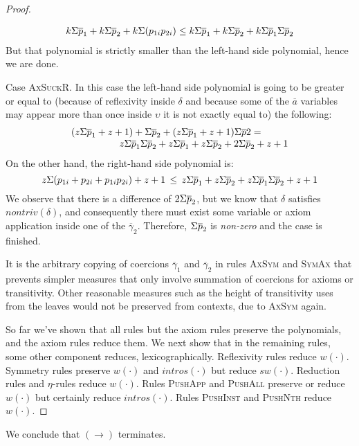 \documentclass[a4paper,UKenglish]{lipics}
\def\rulename#1{\textsc{#1}}
\def\rulename#1{\textsc{#1}}
\newcommand{\ol}[1]{\overline{#1}}
\newcommand{\as}{\ol{a}}
\newcommand{\gammas}{\ol{\gamma}}
\begin{document}
\begin{proof}
\begin{itemize*}
  \[\begin{array}{ll}
       k\Sigma\ps_1 + k\Sigma\ps_2 + k\Sigma(p_{1i}p_{2i}) \leq 
       k\Sigma\ps_1 + k\Sigma\ps_2 + k\Sigma\ps_1\Sigma\ps_2   
  \end{array}\] 
  But that polynomial is strictly smaller than the left-hand side polynomial, hence we are done.
  \item Case \rulename{AxSuckR}. In this case the left-hand side polynomial is going to be greater
        or equal to (because of reflexivity inside $\delta$ and because some of the $\as$ variables may 
        appear more than once inside $\upsilon$ it is not exactly equal to) the following: 
        \[\begin{array}{l} 
           (z\Sigma\ps_1+z+1) + \Sigma\ps_2 + (z\Sigma\ps_1+z+1)\Sigma\ps2 = \\ 
           \quad\quad\quad\quad\quad z\Sigma\ps_1\Sigma\ps_2 + z\Sigma\ps_1 + z\Sigma\ps_2 + 2\Sigma\ps_2 + z + 1 
          \end{array}\]
        On the other hand, the right-hand side polynomial is: 
$$
           z\Sigma(p_{1i}+p_{2i}+p_{1i}p_{2i})+z+1 \, \leq \,   
           z\Sigma\ps_1+z\Sigma\ps_2+z\Sigma\ps_1\Sigma\ps_2+z+1
$$
        We observe that there is a difference of $2\Sigma\ps_2$, but we know that 
        $\delta$ satisfies $nontriv(\delta)$, and consequently there must exist some variable or 
        axiom application inside one of the $\gammas_2$. Therefore, $\Sigma\ps_2$ is 
        {\em non-zero} and the case is finished.
\end{itemize*}
It is the arbitrary copying of coercions $\gammas_1$ and $\gammas_2$ in rules \rulename{AxSym} and \rulename{SymAx} 
that prevents simpler measures that only involve summation of coercions for axioms or transitivity. Other reasonable 
measures such as the height of transitivity uses from the leaves would not be preserved from contexts, 
due to \rulename{AxSym} again.

So far we've shown that all rules but the axiom rules preserve the polynomials, and the axiom rules 
reduce them. We next show that in the remaining rules, some other component reduces, lexicographically.
Reflexivity rules reduce $w(\cdot)$. Symmetry rules preserve $w(\cdot)$ and $intros(\cdot)$ 
but reduce $sw(\cdot)$. Reduction rules and $\eta$-rules reduce $w(\cdot)$. 
Rules \rulename{PushApp} and \rulename{PushAll} preserve or reduce $w(\cdot)$ but certainly 
reduce $intros(\cdot)$. Rules \rulename{PushInst} and \rulename{PushNth} reduce $w(\cdot)$. 
\end{proof}
We conclude that $(\longrightarrow)$ terminates.
\end{document}
